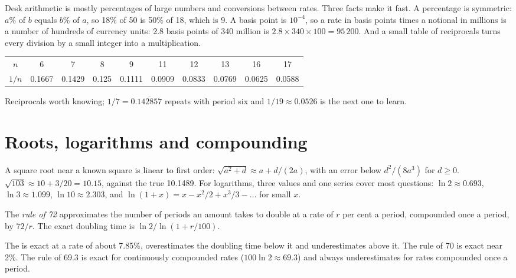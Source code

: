 Desk arithmetic is mostly percentages of large numbers and conversions between rates. Three facts make it
fast. A percentage is symmetric: $a\%$ of $b$ equals $b\%$ of $a$, so 18\% of 50 is 50\% of 18, which is 9.
A basis point is $10^{-4}$, so a rate in basis points times a notional in millions is a number of hundreds of
currency units: 2.8 basis points of 340 million is $2.8 \times 340 \times 100 = 95\,200$. And a small table of
reciprocals turns every division by a small integer into a multiplication.

\begin{center}
\small
\begin{tabular}{@{}cccccccccc@{}}
\toprule
$n$ & 6 & 7 & 8 & 9 & 11 & 12 & 13 & 16 & 17 \\
$1/n$ & 0.1667 & 0.1429 & 0.125 & 0.1111 & 0.0909 & 0.0833 & 0.0769 & 0.0625 & 0.0588 \\
\bottomrule
\end{tabular}

\smallskip
{\small Reciprocals worth knowing; $1/7 = 0.\overline{142857}$ repeats with period six and $1/19 \approx
0.0526$ is the next one to learn.}
\end{center}

\section{Roots, logarithms and compounding}

A square root near a known square is linear to first order: $\sqrt{a^2 + d} \approx a + d/(2a)$, with an error
below $d^2/(8a^3)$ for $d \ge 0$. $\sqrt{103} \approx 10 + 3/20 = 10.15$, against the true 10.1489. For
logarithms, three values and one series cover most questions: $\ln 2 \approx 0.693$, $\ln 3 \approx 1.099$,
$\ln 10 \approx 2.303$, and $\ln(1 + x) = x - x^2/2 + x^3/3 - \dots$ for small $x$.

\begin{definition}[Rule of 72]\label{def:iv:mental-arithmetic:rule72}
The \emph{rule of 72} approximates the number of periods an amount takes to double at a rate
of $r$ per cent a period, compounded once a period, by $72/r$. The exact doubling time is $\ln 2 / \ln(1 +
r/100)$.
\end{definition}

\begin{proposition}\label{prop:iv:mental-arithmetic:rule72}
The  is exact at a rate of about 7.85\%, overestimates the doubling time below it and
underestimates above it. The rule of 70 is exact near 2\%. The rule of 69.3 is exact for continuously
compounded rates ($100\ln 2 \approx 69.3$) and always underestimates for rates compounded once a period.
\end{proposition}

